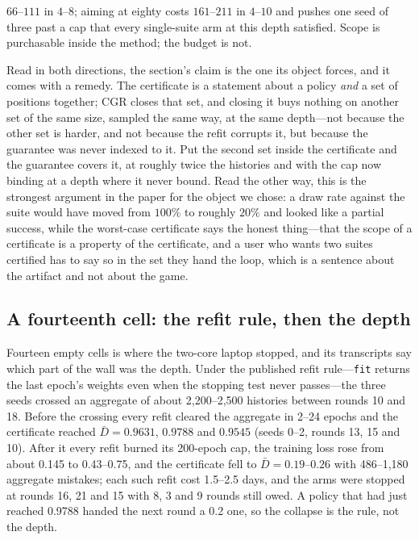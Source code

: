 \documentclass[conference]{IEEEtran}
\begin{document}
$66$--$111$ in $4$--$8$; aiming at eighty costs $161$--$211$ in $4$--$10$ and pushes one seed of three past a cap that every single-suite arm at this depth satisfied. Scope is purchasable inside the method; the budget is not.

Read in both directions, the section's claim is the one its object forces, and it comes with a remedy. The certificate is a statement about a policy \emph{and} a set of positions together; CGR closes that set, and closing it buys nothing on another set of the same size, sampled the same way, at the same depth---not because the other set is harder, and not because the refit corrupts it, but because the guarantee was never indexed to it. Put the second set inside the certificate and the guarantee covers it, at roughly twice the histories and with the cap now binding at a depth where it never bound. Read the other way, this is the strongest argument in the paper for the object we chose: a draw rate against the suite would have moved from $100\%$ to roughly $20\%$ and looked like a partial success, while the worst-case certificate says the honest thing---that the scope of a certificate is a property of the certificate, and a user who wants two suites certified has to say so in the set they hand the loop, which is a sentence about the artifact and not about the game.

\subsection{A fourteenth cell: the refit rule, then the depth}
\label{sec:fourteen}
Fourteen empty cells is where the two-core laptop stopped, and its transcripts say which part of the wall was the depth. Under the published refit rule---\texttt{fit} returns the last epoch's weights even when the stopping test never passes---the three seeds crossed an aggregate of about 2{,}200--2{,}500 histories between rounds 10 and 18. Before the crossing every refit cleared the aggregate in 2--24 epochs and the certificate reached $\bar D=0.9631$, $0.9788$ and $0.9545$ (seeds 0--2, rounds 13, 15 and 10). After it every refit burned its 200-epoch cap, the training loss rose from about 0.145 to 0.43--0.75, and the certificate fell to $\bar D=0.19$--$0.26$ with 486--1{,}180 aggregate mistakes; each such refit cost 1.5--2.5 days, and the arms were stopped at rounds 16, 21 and 15 with 8, 3 and 9 rounds still owed. A policy that had just reached 0.9788 handed the next round a 0.2 one, so the collapse is the rule, not the depth.
\end{document}
